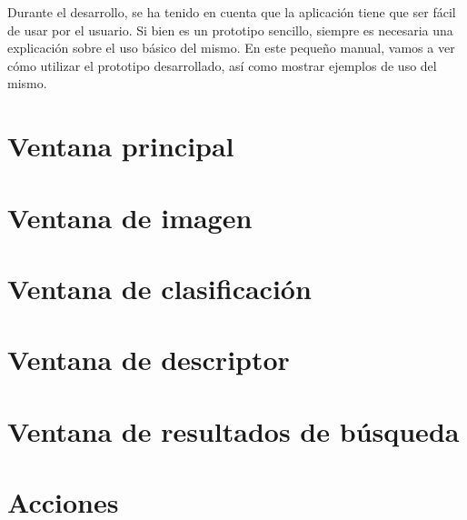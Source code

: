 Durante el desarrollo, se ha tenido en cuenta que la aplicación tiene que ser fácil de usar por el usuario. Si bien es un prototipo sencillo, siempre es necesaria una explicación sobre el uso básico del mismo. En este pequeño manual, vamos a ver cómo utilizar el prototipo desarrollado, así como mostrar ejemplos de uso del mismo. 

\section{Ventana principal}

\section{Ventana de imagen}

\section{Ventana de clasificación}

\section{Ventana de descriptor}

\section{Ventana de resultados de búsqueda}

\section{Acciones}

